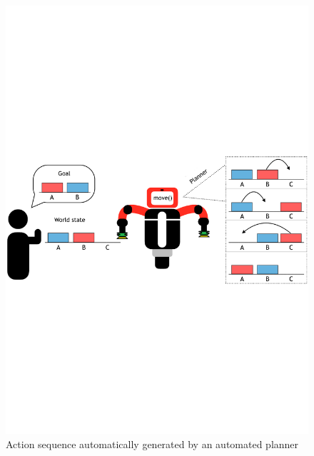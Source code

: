   \begin{figure}[h]
    \centering
    \includegraphics[scale=0.6]{figures/PbD-AutomatedPlanner}
    \caption{Action sequence automatically generated by an automated planner}
    \label{fig:Automated Planner}
  \end{figure}